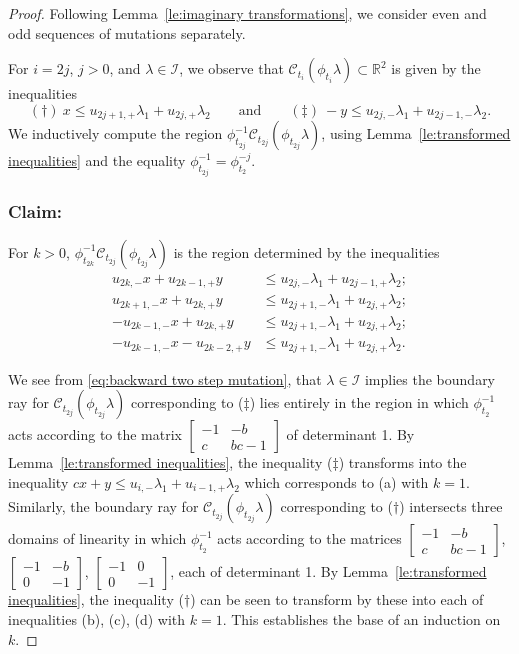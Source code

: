 \documentclass{amsart}
\numberwithin{theorem}{section}
\newcommand{\cC}{\mathcal{C}}
\newcommand{\cI}{\mathcal{I}}
\newcommand{\RR}{\mathbb{R}}
\begin{document}
  \begin{proof}
    Following Lemma~\ref{le:imaginary transformations}, we consider even and odd sequences of mutations separately.

    For $i=2j$, $j>0$, and $\lambda\in\cI$, we observe that $\cC_{t_i}(\phi_{t_i}\lambda)\subset\RR^2$ is given by the inequalities 
    \[ (\dagger)\ x\le u_{2j+1,+}\lambda_1+u_{2j,+}\lambda_2 \qquad\text{and}\qquad (\ddagger)\ -y\le u_{2j,-}\lambda_1+u_{2j-1,-}\lambda_2. \]
    We inductively compute the region $\phi_{t_{2j}}^{-1}\cC_{t_{2j}}(\phi_{t_{2j}}\lambda)$, using Lemma~\ref{le:transformed inequalities} and the equality $\phi_{t_{2j}}^{-1}=\phi_{t_2}^{-j}$.

    \subsubsection*{Claim:} For $k>0$, $\phi_{t_{2k}}^{-1}\cC_{t_{2j}}(\phi_{t_{2j}}\lambda)$ is the region determined by the inequalities 
    \begin{align*}
      \tag{a} u_{2k,-}x+u_{2k-1,+}y &\le u_{2j,-}\lambda_1+u_{2j-1,+}\lambda_2;\\
      \tag{b} u_{2k+1,-}x+u_{2k,+}y &\le u_{2j+1,-}\lambda_1+u_{2j,+}\lambda_2;\\
      \tag{c} -u_{2k-1,-}x+u_{2k,+}y &\le u_{2j+1,-}\lambda_1+u_{2j,+}\lambda_2;\\
      \tag{d} -u_{2k-1,-}x-u_{2k-2,+}y &\le u_{2j+1,-}\lambda_1+u_{2j,+}\lambda_2.
    \end{align*}

    We see from \eqref{eq:backward two step mutation}, that $\lambda\in\cI$ implies the boundary ray for $\cC_{t_{2j}}(\phi_{t_{2j}}\lambda)$ corresponding to ($\ddagger$) lies entirely in the region in which $\phi_{t_2}^{-1}$ acts according to the matrix $\left[ \begin{array}{cc} -1 & -b\\ c & bc-1 \end{array}\right]$ of determinant 1.
    By Lemma~\ref{le:transformed inequalities}, the inequality ($\ddagger$) transforms into the inequality $cx+y\le u_{i,-}\lambda_1+u_{i-1,+}\lambda_2$ which corresponds to (a) with $k=1$.
    Similarly, the boundary ray for $\cC_{t_{2j}}(\phi_{t_{2j}}\lambda)$ corresponding to ($\dagger$) intersects three domains of linearity in which $\phi_{t_2}^{-1}$ acts according to the matrices $\left[ \begin{array}{cc} -1 & -b\\ c & bc-1 \end{array}\right]$, $\left[ \begin{array}{cc} -1 & -b\\ 0 & -1 \end{array}\right]$, $\left[ \begin{array}{cc} -1 & 0\\ 0 & -1 \end{array}\right]$, each of determinant 1.
    By Lemma~\ref{le:transformed inequalities}, the inequality ($\dagger$) can be seen to transform by these into each of inequalities (b), (c), (d) with $k=1$.
    This establishes the base of an induction on $k$.


\end{proof}
\end{document}
